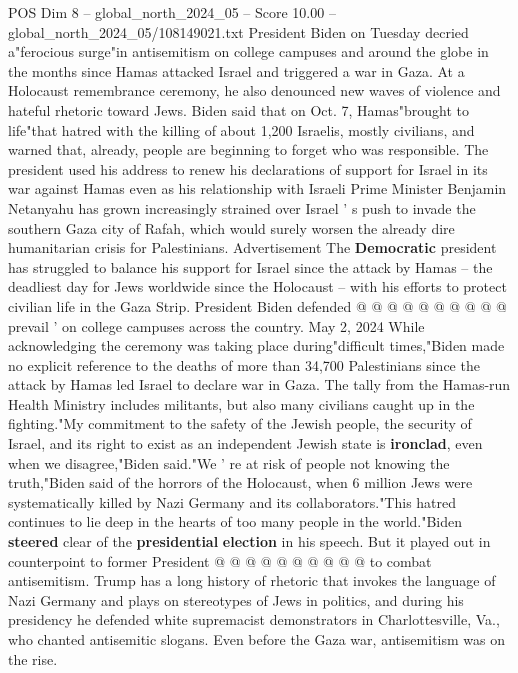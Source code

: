\begin{textsample}{POS Dim 8 – global\_north\_2024\_05 – Score 10.00 – global\_north\_2024\_05/108149021.txt}  \label{ex:f8_pos_076}
President Biden on Tuesday decried a"ferocious surge"in antisemitism on college campuses and around the globe in the months since Hamas attacked Israel and triggered a war in Gaza.
At a Holocaust remembrance ceremony, he also denounced new waves of violence and hateful rhetoric toward Jews.
Biden said that on Oct. 7, Hamas"brought to life"that hatred with the killing of about 1,200 Israelis, mostly civilians, and warned that, already, people are beginning to forget who was responsible.
The president used his address to renew his declarations of support for Israel in its war against Hamas even as his relationship with Israeli Prime Minister Benjamin Netanyahu has grown increasingly strained over Israel ' s push to invade the southern Gaza city of Rafah, which would surely worsen the already dire humanitarian crisis for Palestinians.
Advertisement The \textbf{Democratic} president has struggled to balance his support for Israel since the attack by Hamas -- the deadliest day for Jews worldwide since the Holocaust -- with his efforts to protect civilian life in the Gaza Strip.
President Biden defended @ @ @ @ @ @ @ @ @ @ prevail ' on college campuses across the country.
May 2, 2024 While acknowledging the ceremony was taking place during"difficult times,"Biden made no explicit reference to the deaths of more than 34,700 Palestinians since the attack by Hamas led Israel to declare war in Gaza.
The tally from the Hamas-run Health Ministry includes militants, but also many civilians caught up in the fighting."My commitment to the safety of the Jewish people, the security of Israel, and its right to exist as an independent Jewish state is \textbf{ironclad}, even when we disagree,"Biden said."We ' re at risk of people not knowing the truth,"Biden said of the horrors of the Holocaust, when 6 million Jews were systematically killed by Nazi Germany and its collaborators."This hatred continues to lie deep in the hearts of too many people in the world."Biden \textbf{steered} clear of the \textbf{presidential} \textbf{election} in his speech.
But it played out in counterpoint to former President @ @ @ @ @ @ @ @ @ @ to combat antisemitism.
Trump has a long history of rhetoric that invokes the language of Nazi Germany and plays on stereotypes of Jews in politics, and during his presidency he defended white supremacist demonstrators in Charlottesville, Va., who chanted antisemitic slogans.
Even before the Gaza war, antisemitism was on the rise.

\end{textsample}
